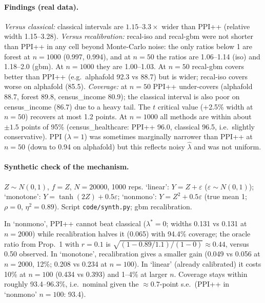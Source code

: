 \documentclass{article}
\begin{document}
\begin{table}[t]\centering\scriptsize\setlength{\tabcolsep}{2.5pt}
\caption{Real data: coverage (\%) and mean width relative to PPI++ (same column, w), 1000 replications, nominal 95\%. Script: \texttt{code/run.py}, \texttt{code/analyze.py}.}\label{tab:real}
\resizebox{\textwidth}{!}{}
\end{table}

\paragraph{Findings (real data).}
\emph{Versus classical:} classical intervals are $1.15$--$3.3\times$ wider than PPI++ (relative width 1.15--3.28). \emph{Versus recalibration:} recal-iso and recal-gbm were not shorter than PPI++ in any cell beyond Monte-Carlo noise: the only ratios below 1 are forest at $n=1000$ (0.997, 0.994), and at $n=50$ the ratios are 1.06--1.14 (iso) and 1.18--2.0 (gbm). At $n=1000$ they are 1.00--1.03. At $n=50$ recal-gbm covers better than PPI++ (e.g.\ alphafold 92.3 vs 88.7) but is wider; recal-iso covers worse on alphafold (85.5). \emph{Coverage:} at $n=50$ PPI++ under-covers (alphafold 88.7, forest 89.8, census\_income 80.9); the classical interval is also poor on census\_income (86.7) due to a heavy tail. The $t$ critical value (+2.5\% width at $n=50$) recovers at most 1.2 points. At $n=1000$ all methods are within about $\pm1.5$ points of 95\% (census\_healthcare: PPI++ 96.0, classical 96.5, i.e.\ slightly conservative). PPI ($\lambda=1$) was sometimes marginally narrower than PPI++ at $n=50$ (down to 0.94 on alphafold) but this reflects noisy $\hat\lambda$ and was not uniform.

\paragraph{Synthetic check of the mechanism.} $Z\sim N(0,1)$, $f=Z$, $N=20000$, 1000 reps. `linear': $Y=Z+\varepsilon$ ($\varepsilon\sim N(0,1)$); `monotone': $Y=\tanh(2Z)+0.5\varepsilon$; `nonmono': $Y=Z^2+0.5\varepsilon$ (true mean 1; $\rho=0$, $\eta^2=0.89$). Script \texttt{code/synth.py}; gbm recalibration.
\begin{table}[t]\centering\small
\caption{Synthetic: coverage (\%) and mean absolute width.}\label{tab:syn}

\end{table}
In `nonmono', PPI++ cannot beat classical ($\lambda^*=0$; widths 0.131 vs 0.131 at $n=2000$) while recalibration halves it (0.065) with 94.4\% coverage; the oracle ratio from Prop.~1 with $r=0.1$ is $\sqrt{(1-0.89/1.1)/(1-0)}\approx0.44$, versus 0.50 observed. In `monotone', recalibration gives a smaller gain (0.049 vs 0.056 at $n=2000$, 12\%; 0.208 vs 0.234 at $n=100$). In `linear' (already calibrated) it costs 10\% at $n=100$ (0.434 vs 0.393) and 1--4\% at larger $n$. Coverage stays within roughly 93.4--96.3\%, i.e.\ nominal given the $\approx0.7$-point s.e.\ (PPI++ in `nonmono' $n=100$: 93.4).
\end{document}
